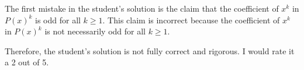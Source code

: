 The first mistake in the student's solution is the claim that the coefficient of $x^k$ in $P(x)^k$ is odd for all $k \geq 1$. This claim is incorrect because the coefficient of $x^k$ in $P(x)^k$ is not necessarily odd for all $k \geq 1$. 

Therefore, the student's solution is not fully correct and rigorous. I would rate it a 2 out of 5.

